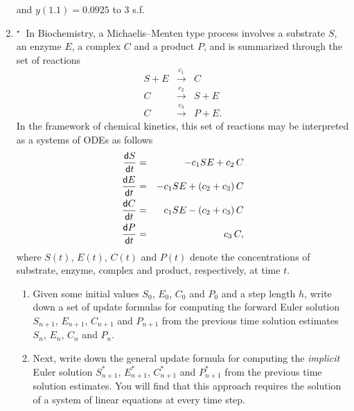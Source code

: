 \documentclass[11pt,a4paper]{article}
\newcommand{\dif}{\mathsf{d}}
\def\tough{$\!\!\!{}^\star\>$}
\begin{document}
\begin{enumerate}
{\begin{enumerate}
\begin{enumerate}
  and $y(1.1)= 0.0925$ to 3 s.f.
\end{enumerate}
\end{enumerate}
 
}{}%



\item \label{qdjsode3}\tough
In Biochemistry, a Michaelis--Menten type process involves
 a substrate $S$, an enzyme $E$, a complex $C$ and a product $P$, and is
 summarized through the set of  reactions 
 \begin{eqnarray*}
S + E &\stackrel{c_1}{\longrightarrow}& C\\
C  &\stackrel{c_2}{\longrightarrow}& S + E\\
C &\stackrel{c_3}{\longrightarrow}& P+E.
\end{eqnarray*}
In the framework of chemical kinetics, this set of reactions may be interpreted as
a systems of ODEs as follows
  \begin{eqnarray*}
{\dif S\over \dif t}   &= &  -c_1 S E  +c_2\,C\\
{\dif E\over \dif t}   &= &  -c_1 S E  + (c_2 +c_3) \,C\\
{\dif C\over \dif t}   &= &  c_1 S E  - (c_2 +c_3) \,C\\
{\dif P\over \dif t}   &= &  c_3 \,C,
\end{eqnarray*}
where  $S(t)$,   $E(t)$,  $C(t)$ and  $P(t)$ denote the concentrations of substrate,
enzyme, complex and product, respectively,  at time $t$. 

 \begin{enumerate}
\item 
Given some initial values $S_0$,   $E_0$,  $C_0$ and  $P_0$ and a step length $h$,
write down a set of update formulas for computing the forward Euler solution
 $S_{n+1}$,   $E_{n+1}$,  $C_{n+1}$ and  $P_{n+1}$   from the previous time
 solution estimates  $S_{n}$,   $E_{n}$,  $C_{n}$ and  $P_{n}$. 
 \item
 Next, write down the general update formula for computing the {\it implicit} Euler 
solution
$S^*_{n+1}$,   $E^*_{n+1}$,  $C^*_{n+1}$ and  $P^*_{n+1}$   from the previous 
time solution  estimates.  You will  find that this approach requires the solution of a 
system of linear equations at every time step.  
\end{enumerate}


\end{enumerate}
\end{document}
